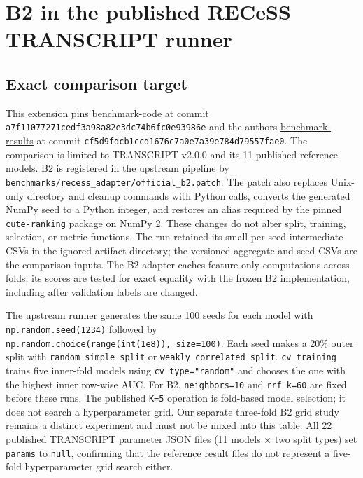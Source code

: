\documentclass[
  10pt,
]{ctexart}
\author{}
\date{}
\begin{document}
\section{B2 in the published RECeSS TRANSCRIPT
runner}\label{b2-in-the-published-recess-transcript-runner}

\subsection{Exact comparison target}\label{exact-comparison-target}

This extension pins
\href{https://github.com/RECeSS-EU-Project/benchmark-code}{benchmark-code}
at commit \texttt{a7f11077271ced\allowbreak{}f3a98a82e3dc74\allowbreak{}b6fc0e93986e} and the
authors\textquotesingle{}
\href{https://github.com/RECeSS-EU-Project/benchmark-results}{benchmark-results}
at commit \texttt{cf5d9fdcb1ccd1\allowbreak{}676c7a0e7a39e7\allowbreak{}84d79557fae0}. The
comparison is limited to TRANSCRIPT v2.0.0 and its 11 published
reference models. B2 is registered in the upstream pipeline by
\texttt{benchmarks/\allowbreak{}recess\_\allowbreak{}adapter/\allowbreak{}official\_\allowbreak{}b2.\allowbreak{}patch}. The patch also
replaces Unix-only directory and cleanup commands with Python calls,
converts the generated NumPy seed to a Python integer, and restores an
alias required by the pinned \texttt{cute-ranking} package on NumPy 2.
These changes do not alter split, training, selection, or metric
functions. The run retained its small per-seed intermediate CSVs in the
ignored artifact directory; the versioned aggregate and seed CSVs are
the comparison inputs. The B2 adapter caches feature-only computations
across folds; its scores are tested for exact equality with the frozen
B2 implementation, including after validation labels are changed.

The upstream runner generates the same 100 seeds for each model with
\texttt{np.\allowbreak{}random.\allowbreak{}seed(1234)} followed by
\texttt{np.\allowbreak{}random.\allowbreak{}choice(range(int(1e8)),\ size=100)}. Each seed makes a
20\% outer split with \texttt{random\_\allowbreak{}simple\_\allowbreak{}split} or
\texttt{weakly\_\allowbreak{}correlated\_\allowbreak{}split}. \texttt{cv\_\allowbreak{}training} trains five
inner-fold models using \texttt{cv\_\allowbreak{}type="random"} and chooses the one
with the highest inner row-wise AUC. For B2, \texttt{neighbors=10} and
\texttt{rrf\_\allowbreak{}k=60} are fixed before these runs. The published
\texttt{K=5} operation is fold-based model selection; it does not search
a hyperparameter grid. Our separate three-fold B2 grid study remains a
distinct experiment and must not be mixed into this table. All 22
published TRANSCRIPT parameter JSON files (11 models × two split types)
set \texttt{params} to \texttt{null}, confirming that the reference
result files do not represent a five-fold hyperparameter grid search
either.
\end{document}

